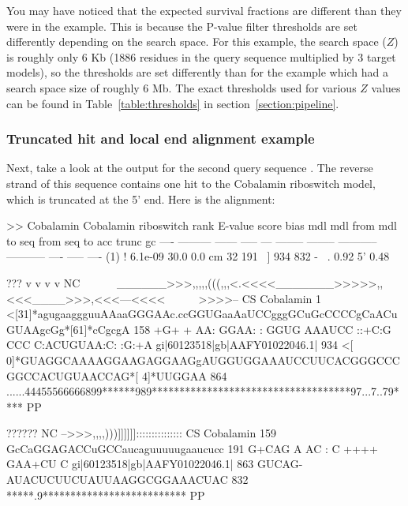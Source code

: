 You may have noticed that the expected survival fractions are
different than they were in the  example. This is
because the P-value filter thresholds are set differently depending on
the search space. For this example, the search space ($Z$) is roughly
only 6 Kb (1886 residues in the query sequence multiplied by 3 target
models), so the thresholds are set differently than for the
 example which had a search space size of roughly 6
Mb. The exact thresholds used for various $Z$ values can be found in
Table~\ref{table:thresholds} in section~\ref{section:pipeline}.

\subsubsection{Truncated hit and local end alignment example}
Next, take a look at the  output for the second query
sequence . The reverse strand of this sequence
contains one hit to the Cobalamin riboswitch model, which is truncated
at the 5' end. Here is the alignment:

\begin{sreoutput}
>> Cobalamin  Cobalamin riboswitch
 rank     E-value  score  bias mdl mdl from   mdl to       seq from      seq to       acc trunc   gc
 ----   --------- ------ ----- --- -------- --------    ----------- -----------      ---- ----- ----
  (1) !   6.1e-09   30.0   0.0  cm       32      191 ~]         934         832 - ~. 0.92    5' 0.48

                                                 ???              v           v      v    v                          NC
                                     ~~~~~~______>>>,,,,,(((,,,<.<<<<_______>>>>>,,<<<____>>>,<<<---<<<<~~~~~~>>>>-- CS
                       Cobalamin   1 <[31]*agugaaggguuAAaaGGGAAc.ccGGUGaaAaUCCgggGCuGcCCCCgCaACuGUAAgcGg*[61]*cCgcgA 158
                                             +G+     + AA: GGAA: : GGUG AAAUCC ::+C:G CCC  C:ACUGUAA:C:        :G:+A
  gi|60123518|gb|AAFY01022046.1| 934 <[ 0]*GUAGGCAAAAGGAAGAGGAAGgAUGGUGGAAAUCCUUCACGGGCCCGGCCACUGUAACCAG*[ 4]*UUGGAA 864
                                     ......44455566666899******989************************************97...7..79**** PP

                                                 ??????                NC
                                     -->>>,,,,)))]]]]]]::::::::::::::: CS
                       Cobalamin 159 GcCaGGAGACCuGCCaucaguuuuugaaucucc 191
                                     G+CAG A AC :  C   ++++   GAA+CU C
  gi|60123518|gb|AAFY01022046.1| 863 GUCAG-AUACUCUUCUAUUAAGGCGGAAACUAC 832
                                     *****.9************************** PP
\end{sreoutput}

